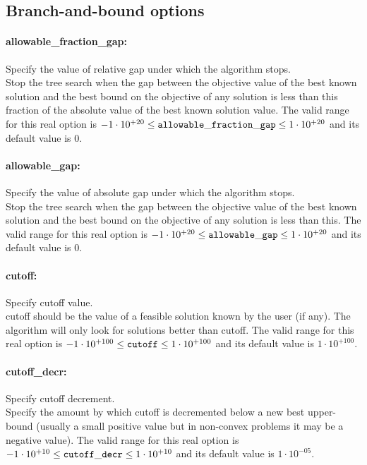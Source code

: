\subsection{Branch-and-bound options}
\label{sec:Branch-and-bound_options}
\paragraph{\bf allowable\_fraction\_gap:}\label{sec:allowable_fraction_gap} Specify the value of relative gap under which the algorithm stops. $\;$ \\
 Stop the tree search when the gap between the
objective value of the best known solution and
the best bound on the objective of any solution
is less than this fraction of the absolute value
of the best known solution value. The valid range for this real option is 
$-1 \cdot 10^{+20} \le {\tt allowable\_fraction\_gap } \le 1 \cdot 10^{+20}$
and its default value is $0$.


\paragraph{\bf allowable\_gap:}\label{sec:allowable_gap} Specify the value of absolute gap under which the algorithm stops. $\;$ \\
 Stop the tree search when the gap between the
objective value of the best known solution and
the best bound on the objective of any solution
is less than this. The valid range for this real option is 
$-1 \cdot 10^{+20} \le {\tt allowable\_gap } \le 1 \cdot 10^{+20}$
and its default value is $0$.


\paragraph{\bf cutoff:}\label{sec:cutoff} Specify cutoff value. $\;$ \\
 cutoff should be the value of a feasible solution
known by the user (if any). The algorithm will
only look for solutions better than cutoff. The valid range for this real option is 
$-1 \cdot 10^{+100} \le {\tt cutoff } \le 1 \cdot 10^{+100}$
and its default value is $1 \cdot 10^{+100}$.


\paragraph{\bf cutoff\_decr:}\label{sec:cutoff_decr} Specify cutoff decrement. $\;$ \\
 Specify the amount by which cutoff is decremented
below a new best upper-bound (usually a small
positive value but in non-convex problems it may
be a negative value). The valid range for this real option is 
$-1 \cdot 10^{+10} \le {\tt cutoff\_decr } \le 1 \cdot 10^{+10}$
and its default value is $1 \cdot 10^{-05}$.


